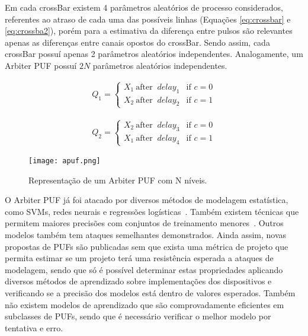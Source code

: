 \documentclass[pdftex,12pt]{article}
\begin{document}
\begin{spacing}{1.5}
\FloatBarrier

Em cada crossBar existem 4 parâmetros aleatórios de processo considerados, referentes ao atraso de cada uma das possíveis linhas (Equações \ref{eq:crossbar} e \ref{eq:crossba2}), porém para a estimativa da diferença entre pulsos são relevantes apenas as diferenças entre canais opostos do crossBar. Sendo assim, cada crossBar possuí apenas 2 parâmetros aleatórios independentes. Analogamente, um Arbiter PUF possuí $2N$ parâmetros aleatórios independentes.

\begin{eqnarray}
\label{eq:crossbar}
Q_1 = \left\{
	\begin{array}{ll}
		X_1 \ \mbox{after } \ delay_1  & \mbox{if } c = 0 \\
		X_2 \ \mbox{after } \ delay_2  & \mbox{if } c = 1
	\end{array}
\right.
\end{eqnarray}

\begin{eqnarray}
\label{eq:crossba2}
Q_2 = \left\{
	\begin{array}{ll}
		X_2 \ \mbox{after } \ delay_3  & \mbox{if } c = 0 \\
		X_1 \ \mbox{after } \ delay_4  & \mbox{if } c = 1
	\end{array}
\right.
\end{eqnarray}


\begin{figure}
\label{fig:apuf}
\centering
\texttt{[image: apuf.png]}
\caption{Representação de um Arbiter PUF com N níveis.}
\end{figure}


O Arbiter PUF já foi atacado por diversos métodos de modelagem estatística, como SVMs, redes neurais e regressões logísticas~\cite{RuhrmairSSDDS10,RuhrmairD13}. Também existem técnicas que permitem maiores precisões com conjuntos de treinamento menores~\cite{RuhrmairD13}. Outros modelos também tem ataques semelhantes demonstrados. Ainda assim, novas propostas de PUFs são publicadas sem que exista uma métrica de projeto que permita estimar se um projeto terá uma resistência esperada a ataques de modelagem, sendo que só é possível determinar estas propriedades aplicando diversos métodos de aprendizado sobre implementações dos dispositivos e verificando se a precisão dos modelos está dentro de valores esperados. Também não existem modelos de aprendizado que são comprovadamente eficientes em subclasses de PUFs, sendo que é necessário verificar o melhor modelo por tentativa e erro.


\end{spacing}
\end{document}
